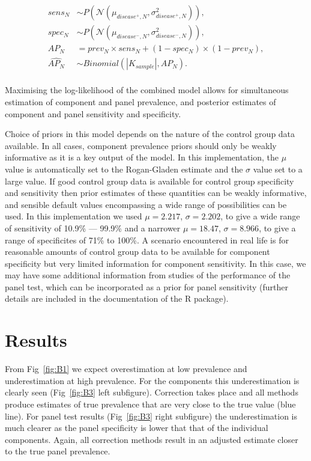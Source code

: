 \documentclass[a4paper, 12pt, twoside]{article}
\let\Oldsection\section
\renewcommand{\section}{\FloatBarrier\Oldsection}
\begin{document}
\begin{equation*}
\begin{aligned}
sens_N &\sim P(\mathcal{N}(\mu_{disease^+,N}, \sigma_{disease^+,N}^2)), \\
spec_N &\sim P(\mathcal{N}(\mu_{disease^-,N}, \sigma_{disease^-,N}^2)), \\
AP_N &= prev_N \times sens_N + (1-spec_N) \times (1-prev_N), \\
\widehat{AP_N} &\sim Binomial(|K_{sample}|, AP_N). \\
\end{aligned}
\end{equation*}

Maximising the log-likelihood of the combined model allows for simultaneous estimation of component and panel prevalence, and posterior estimates of component and panel sensitivity and specificity.

Choice of priors in this model depends on the nature of the control group data available. In all cases, component prevalence priors should only be weakly informative as it is a key output of the model. In this implementation, the \(\mu\) value is automatically set to the Rogan-Gladen estimate and the \(\sigma\) value set to a large value. If good control group data is available for control group specificity and sensitivity then prior estimates of these quantities can be weakly informative, and sensible default values encompassing a wide range of possibilities can be used. In this implementation we used \(\mu=2.217\), \(\sigma=2.202\), to give a wide range of sensitivity of 10.9\% — 99.9\% and a narrower \(\mu=18.47\), \(\sigma=8.966\), to give a range of specificites of 71\% to 100\%. A scenario encountered in real life is for reasonable amounts of control group data to be available for component specificity but very limited information for component sensitivity. In this case, we may have some additional information from studies of the performance of the panel test, which can be incorporated as a prior for panel sensitivity (further details are included in the documentation of the R package\cite{challen2023d}).

\section{Results}

From Fig~\ref{fig:B1} we expect overestimation at low prevalence and underestimation at high prevalence. For the components this underestimation is clearly seen (Fig~\ref{fig:B3} left subfigure). Correction takes place and all methods produce estimates of true prevalence that are very close to the true value (blue line). For panel test results (Fig~\ref{fig:B3} right subfigure) the underestimation is much clearer as the panel specificity is lower that that of the individual components. Again, all correction methods result in an adjusted estimate closer to the true panel prevalence.
\end{document}
